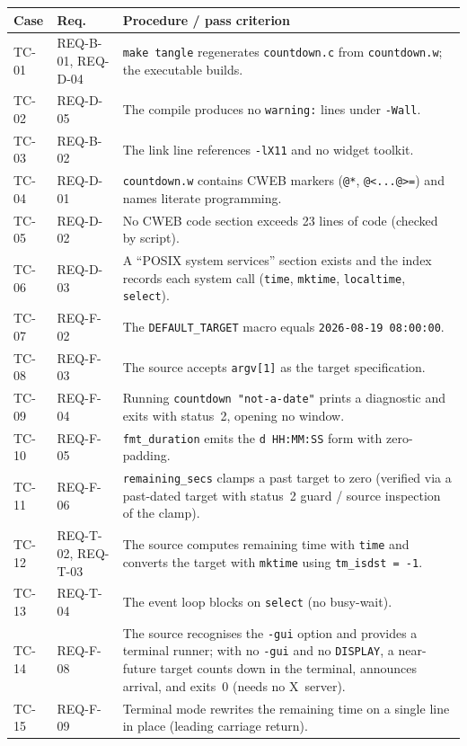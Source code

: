 \documentclass[12pt]{article}
\newcommand{\code}[1]{\texttt{#1}}
\begin{document}
\begin{longtable}{p{}p{}p{}}
\toprule
\textbf{Case} & \textbf{Req.} & \textbf{Procedure / pass criterion} \\
\midrule
\endhead
TC-01 & REQ-B-01, REQ-D-04 & \code{make tangle} regenerates \code{countdown.c} from \code{countdown.w}; the executable builds. \\
TC-02 & REQ-D-05 & The compile produces no \code{warning:} lines under \code{-Wall}. \\
TC-03 & REQ-B-02 & The link line references \code{-lX11} and no widget toolkit. \\
TC-04 & REQ-D-01 & \code{countdown.w} contains CWEB markers (\code{@*}, \code{@<...@>=}) and names literate programming. \\
TC-05 & REQ-D-02 & No CWEB code section exceeds 23 lines of code (checked by script). \\
TC-06 & REQ-D-03 & A ``POSIX system services'' section exists and the index records each system call (\code{time}, \code{mktime}, \code{localtime}, \code{select}). \\
TC-07 & REQ-F-02 & The \code{DEFAULT\_TARGET} macro equals \code{2026-08-19 08:00:00}. \\
TC-08 & REQ-F-03 & The source accepts \code{argv[1]} as the target specification. \\
TC-09 & REQ-F-04 & Running \code{countdown "not-a-date"} prints a diagnostic and exits with status~2, opening no window. \\
TC-10 & REQ-F-05 & \code{fmt\_duration} emits the \code{d HH:MM:SS} form with zero-padding. \\
TC-11 & REQ-F-06 & \code{remaining\_secs} clamps a past target to zero (verified via a past-dated target with status~2 guard / source inspection of the clamp). \\
TC-12 & REQ-T-02, REQ-T-03 & The source computes remaining time with \code{time} and converts the target with \code{mktime} using \code{tm\_isdst = -1}. \\
TC-13 & REQ-T-04 & The event loop blocks on \code{select} (no busy-wait). \\
TC-14 & REQ-F-08 & The source recognises the \code{-gui} option and provides a terminal runner; with no \code{-gui} and no \code{DISPLAY}, a near-future target counts down in the terminal, announces arrival, and exits~0 (needs no X~server). \\
TC-15 & REQ-F-09 & Terminal mode rewrites the remaining time on a single line in place (leading carriage return). \\

\end{longtable}
\end{document}
